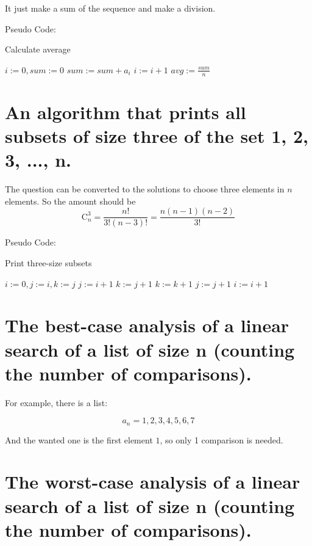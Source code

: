 \documentclass[12pt]{article}
\begin{document}
It just make a sum of the sequence and make a division.

Pseudo Code:
\begin{algorithm}
\caption{Calculate average}
\begin{algorithmic}[1]
	\State $i := 0, sum := 0$
		\State $ sum := sum + a_i $
		\State $ i := i + 1 $
	\EndWhile
	\State $ avg := \frac{sum}{n}$
\end{algorithmic}
\end{algorithm}

\section{An algorithm that prints all subsets of size three of the set {1, 2, 3, ..., n}.}

The question can be converted to the solutions to choose three elements in $n$ elements. So the amount should be 
$$\mathrm{C}_{n}^{3}=\frac{n!}{3!(n-3)!}=\frac{n(n-1)(n-2)}{3!}$$

Pseudo Code:
\begin{algorithm}
\caption{Print three-size subsets}
\begin{algorithmic}[1]
	\State $ i := 0, j := i, k := j $
		\State $ j := i + 1 $
			\State $ k := j + 1 $
				\State {}
				\State $ k := k + 1 $
			\EndWhile
			\State $ j := j + 1 $
		\EndWhile
		\State $ i := i + 1 $
	\EndWhile
\end{algorithmic}
\end{algorithm}

\section{The best-case analysis of a linear search of a list of size n (counting the number of comparisons).}

For example, there is a list:

$${a_n} = {1, 2, 3, 4, 5, 6, 7}$$

And the wanted one is the first element $1$, so only 1 comparison is needed.

\section{The worst-case analysis of a linear search of a list of size n (counting the number of comparisons).}
\end{document}
